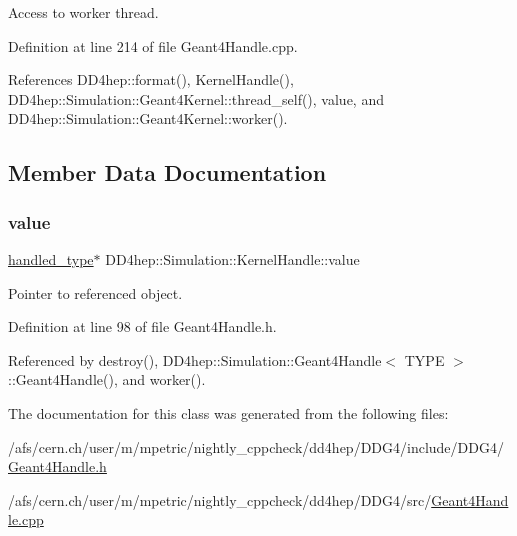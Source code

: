 Access to worker thread. 



Definition at line 214 of file Geant4\+Handle.\+cpp.



References D\+D4hep\+::format(), Kernel\+Handle(), D\+D4hep\+::\+Simulation\+::\+Geant4\+Kernel\+::thread\+\_\+self(), value, and D\+D4hep\+::\+Simulation\+::\+Geant4\+Kernel\+::worker().



\subsection{Member Data Documentation}
\hypertarget{class_d_d4hep_1_1_simulation_1_1_kernel_handle_a1d57797e5b730bb29365c2cd92911582}{}\label{class_d_d4hep_1_1_simulation_1_1_kernel_handle_a1d57797e5b730bb29365c2cd92911582} 
\subsubsection{\texorpdfstring{value}{value}}
{\footnotesize\ttfamily \hyperlink{class_d_d4hep_1_1_simulation_1_1_kernel_handle_ab3846addea4978dab36bdb0cfb53dc34}{handled\+\_\+type}$\ast$ D\+D4hep\+::\+Simulation\+::\+Kernel\+Handle\+::value\hspace{0.3cm}{\ttfamily [mutable]}}



Pointer to referenced object. 



Definition at line 98 of file Geant4\+Handle.\+h.



Referenced by destroy(), D\+D4hep\+::\+Simulation\+::\+Geant4\+Handle$<$ T\+Y\+P\+E $>$\+::\+Geant4\+Handle(), and worker().



The documentation for this class was generated from the following files\+:\begin{DoxyCompactItemize}
\item 
/afs/cern.\+ch/user/m/mpetric/nightly\+\_\+cppcheck/dd4hep/\+D\+D\+G4/include/\+D\+D\+G4/\hyperlink{_geant4_handle_8h}{Geant4\+Handle.\+h}\item 
/afs/cern.\+ch/user/m/mpetric/nightly\+\_\+cppcheck/dd4hep/\+D\+D\+G4/src/\hyperlink{_geant4_handle_8cpp}{Geant4\+Handle.\+cpp}\end{DoxyCompactItemize}
